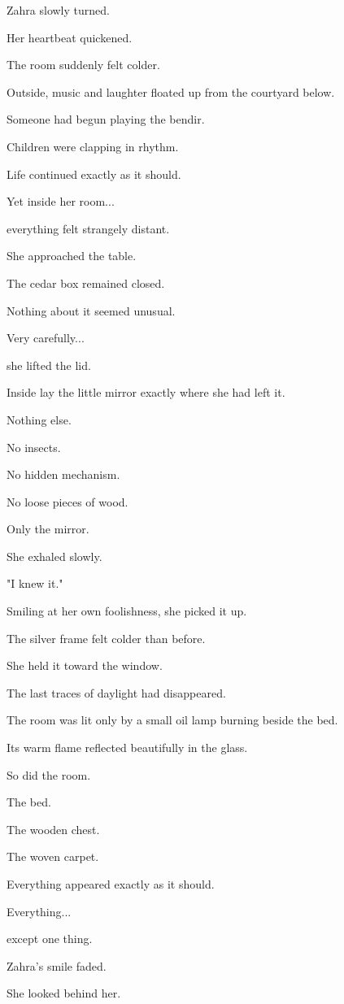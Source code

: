 \documentclass[12pt,openany]{book}
\begin{document}
Zahra slowly turned.

Her heartbeat quickened.

The room suddenly felt colder.

Outside, music and laughter floated up from the courtyard below.

Someone had begun playing the bendir.

Children were clapping in rhythm.

Life continued exactly as it should.

Yet inside her room...

everything felt strangely distant.

She approached the table.

The cedar box remained closed.

Nothing about it seemed unusual.

Very carefully...

she lifted the lid.

Inside lay the little mirror exactly where she had left it.

Nothing else.

No insects.

No hidden mechanism.

No loose pieces of wood.

Only the mirror.

She exhaled slowly.

"I knew it."

Smiling at her own foolishness, she picked it up.

The silver frame felt colder than before.

She held it toward the window.

The last traces of daylight had disappeared.

The room was lit only by a small oil lamp burning beside the bed.

Its warm flame reflected beautifully in the glass.

So did the room.

The bed.

The wooden chest.

The woven carpet.

Everything appeared exactly as it should.

Everything...

except one thing.

Zahra's smile faded.

She looked behind her.
\end{document}
